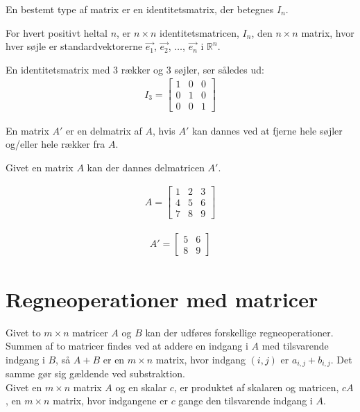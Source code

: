 En bestemt type af matrix er en identitetsmatrix, der betegnes $I_n$. 

\begin{defn} [Identitetsmatrix]\label{def:imatrix}
For hvert positivt heltal $n$, er $n \times n$ identitetsmatricen, $I_n$, den $n \times n$ matrix, hvor hver søjle er standardvektorerne $\vec{e_1}$, $\vec{e_2}$, $\dots$, $\vec{e_n}$ i $\mathbb{R}^n$.
\end{defn}

En identitetsmatrix med $3$ rækker og $3$ søjler, ser således ud:
\begin{align*}
I_3 = \begin{bmatrix}
	1 & 0 & 0 \\
	0 & 1 & 0 \\
	0 & 0 & 1 
\end{bmatrix}
\end{align*}

\begin{defn} [Delmatrix]\label{delmatrix}
En matrix $A'$ er en delmatrix af $A$, hvis $A'$ kan dannes ved at fjerne hele søjler og/eller hele rækker fra $A$.
\end{defn}

Givet en matrix $A$ kan der dannes delmatricen $A'$.

\begin{align*}
A = \begin{bmatrix}
	1 & 2 & 3 \\
	4 & 5 & 6 \\
	7 & 8 & 9 
\end{bmatrix}
\end{align*}

\begin{align*}
A' = \begin{bmatrix}
	5 & 6 \\
	8 & 9
\end{bmatrix}
\end{align*}



\section{Regneoperationer med matricer}
Givet to $m \times n$ matricer $A$ og $B$ kan der udføres forskellige regneoperationer. 
Summen af to matricer findes ved at addere en indgang i $A$ med tilsvarende indgang i $B$, så $A+B$ er en $m \times n$ matrix, hvor indgang $(i,j)$ er $a_{i,j}+b_{i,j}$. 
Det samme gør sig gældende ved substraktion. \\
Givet en $m \times n$ matrix $A$ og en skalar $c$, er produktet af skalaren og matricen, $cA$, en $m \times n$ matrix, hvor indgangene er $c$ gange den tilsvarende indgang i $A$. \\

